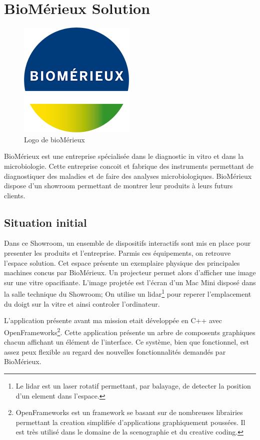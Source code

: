 \section{BioMérieux Solution}

\begin{figure}[h]
    \centering
    \includegraphics[scale=0.5]{img/bmx.png}
    \caption{Logo de bioMérieux}
\end{figure}

BioMérieux est une entreprise spécialisée dans le diagnostic in vitro et dans la microbiologie.
Cette entreprise concoit et fabrique des instruments permettant de diagnostiquer des maladies et de faire des analyses microbiologiques.
BioMérieux dispose d'un showroom permettant de montrer leur produits à leurs futurs clients.

\subsection{Situation initial}

Dans ce Showroom, un ensemble de dispositifs interactifs sont mis en place pour presenter les produits et l'entreprise.
Parmis ces équipements, on retrouve l'espace solution.
Cet espace présente un exemplaire physique des principales machines concus par BioMérieux.
Un projecteur permet alors d'afficher une image sur une vitre opacifiante.
L'image projetée est l'écran d'un Mac Mini disposé dans la salle technique du Showroom;
On utilise un lidar\footnote{Le lidar est un laser rotatif permettant, par balayage, de detecter la position d'un element dans l'espace.} pour reperer l'emplacement du doigt sur la vitre et ainsi controler l'ordinateur.

L'application présente avant ma mission etait développée en C++ avec OpenFrameworks\footnote{OpenFrameworks est un framework se basant sur de nombreuses librairies permettant la creation simplifiée d'applications graphiquement poussées. Il est très utilisé dans le domaine de la scenographie et du creative coding.}.
Cette application présente un arbre de composents graphiques chacun affichant un élément de l'interface.
Ce système, bien que fonctionnel, est assez peux flexible au regard des nouvelles fonctionnalités demandés par BioMérieux.

